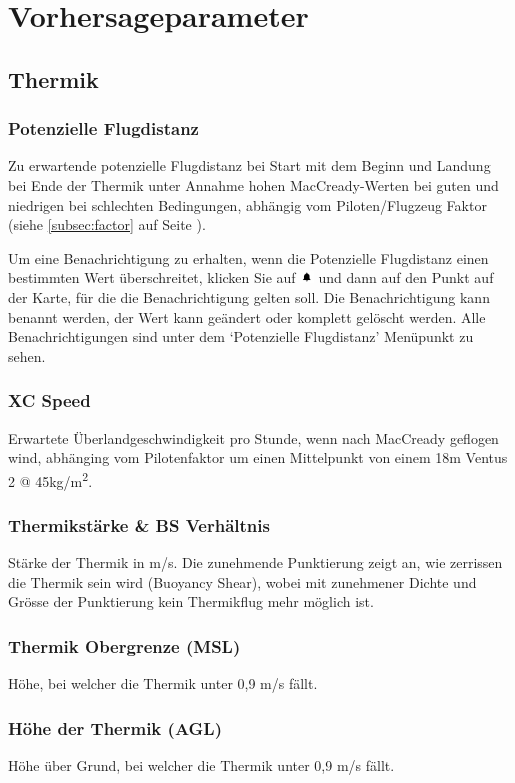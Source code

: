 \documentclass[11pt,a4paper]{article}
\begin{document}
\pagebreak
\appendix
\section{Vorhersageparameter}

\subsection{Thermik}
\subsubsection{Potenzielle Flugdistanz}
Zu erwartende potenzielle Flugdistanz bei Start mit dem Beginn und Landung bei Ende der Thermik unter Annahme hohen MacCready-Werten bei guten und niedrigen bei schlechten Bedingungen, abhängig vom Piloten/Flugzeug Faktor (siehe \ref{subsec:factor} auf Seite \pageref{subsec:factor}).

Um eine Benachrichtigung zu erhalten, wenn die Potenzielle Flugdistanz einen bestimmten Wert überschreitet, klicken Sie auf \includegraphics[height=9pt]{images/icons/bell.png} und dann auf den Punkt auf der Karte, für die die Benachrichtigung gelten soll. Die Benachrichtigung kann benannt werden, der Wert kann geändert oder komplett gelöscht werden. Alle Benachrichtigungen sind unter dem `Potenzielle Flugdistanz' Menüpunkt zu sehen.

\subsubsection{XC Speed}
Erwartete Überlandgeschwindigkeit pro Stunde, wenn nach MacCready geflogen wind, abhänging vom Pilotenfaktor um einen Mittelpunkt von einem 18m Ventus 2 @ 45kg/m\textsuperscript{2}.
\subsubsection{Thermikstärke \& BS Verhältnis}
Stärke der Thermik in m/s. Die zunehmende Punktierung zeigt an, wie zerrissen die Thermik sein wird (Buoyancy Shear), wobei mit zunehmener Dichte und Grösse der Punktierung kein Thermikflug mehr möglich ist.
\subsubsection{Thermik Obergrenze (MSL)}
Höhe, bei welcher die Thermik unter 0,9 m/s fällt.
\subsubsection{Höhe der Thermik (AGL)}
Höhe über Grund, bei welcher die Thermik unter 0,9 m/s fällt.
\end{document}
